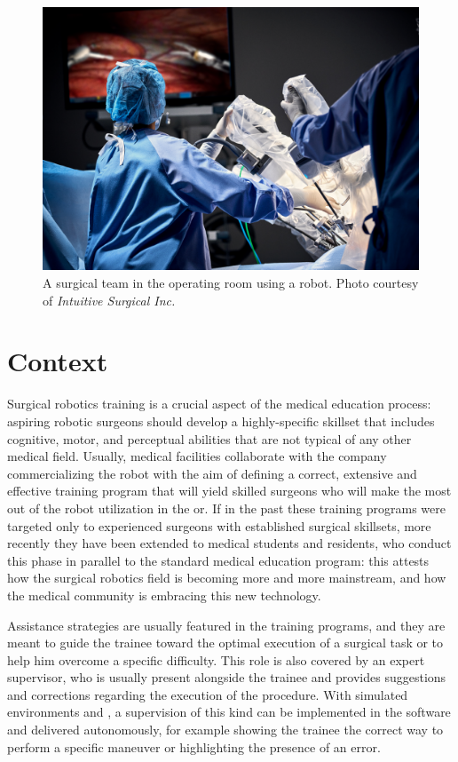 \documentclass[../main.tex]{subfiles}
\begin{document}
\begin{figure}[h]
    \centering
    \includegraphics[width=\textwidth]{images/davinci_or.jpg}
    \caption{A surgical team in the operating room using a \davinci robot. Photo courtesy of \textit{Intuitive Surgical Inc.}}
    \label{fig:davincior}
\end{figure}

\section{Context}
Surgical robotics training is a crucial aspect of the medical education process: aspiring robotic surgeons should develop a highly-specific skillset that includes cognitive, motor, and perceptual abilities that are not typical of any other medical field. Usually, medical facilities collaborate with the company commercializing the robot with the aim of defining a correct, extensive and effective training program that will yield skilled surgeons who will make the most out of the robot utilization in the \ac{or}. If in the past these training programs were targeted only to experienced surgeons with established surgical skillsets, more recently they have been extended to medical students and residents, who conduct this phase in parallel to the standard medical education program: this attests how the surgical robotics field is becoming more and more mainstream, and how the medical community is embracing this new technology. 

Assistance strategies are usually featured in the training programs, and they are meant to guide the trainee toward the optimal execution of a surgical task or to help him overcome a specific difficulty. This role is also covered by an expert supervisor, who is usually present alongside the trainee and provides suggestions and corrections regarding the execution of the procedure. With simulated environments and \vr, a supervision of this kind can be implemented in the software and delivered autonomously, for example showing the trainee the correct way to perform a specific maneuver or highlighting the presence of an error. 
\end{document}
